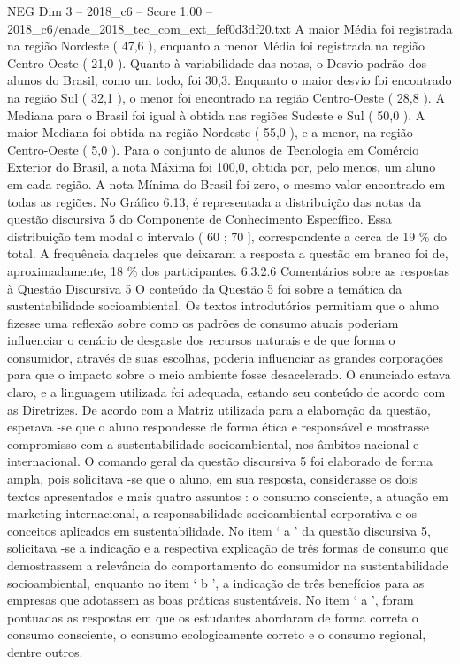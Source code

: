 \begin{textsample}{NEG Dim 3 – 2018\_c6 – Score 1.00 – 2018\_c6/enade\_2018\_tec\_com\_ext\_fef0d3df20.txt}
A maior Média foi registrada na região Nordeste ( 47,6 ), enquanto a menor Média foi registrada na região Centro-Oeste ( 21,0 ).
Quanto à variabilidade das notas, o Desvio padrão dos alunos do Brasil, como um todo, foi 30,3.
Enquanto o maior desvio foi encontrado na região Sul ( 32,1 ), o menor foi encontrado na região Centro-Oeste ( 28,8 ).
A Mediana para o Brasil foi igual à obtida nas regiões Sudeste e Sul ( 50,0 ).
A maior Mediana foi obtida na região Nordeste ( 55,0 ), e a menor, na região Centro-Oeste ( 5,0 ).
Para o conjunto de alunos de Tecnologia em Comércio Exterior do Brasil, a nota Máxima foi 100,0, obtida por, pelo menos, um aluno em cada região.
A nota Mínima do Brasil foi zero, o mesmo valor encontrado em todas as regiões.
No Gráfico 6.13, é representada a distribuição das notas da questão discursiva 5 do Componente de Conhecimento Específico.
Essa distribuição tem modal o intervalo ( 60 ; 70 ], correspondente a cerca de 19 \% do total.
A frequência daqueles que deixaram a resposta a questão em branco foi de, aproximadamente, 18 \% dos participantes. 6.3.2.6 Comentários sobre as respostas à Questão Discursiva 5 O conteúdo da Questão 5 foi sobre a temática da sustentabilidade socioambiental.
Os textos introdutórios permitiam que o aluno fizesse uma reflexão sobre como os padrões de consumo atuais poderiam influenciar o cenário de desgaste dos recursos naturais e de que forma o consumidor, através de suas escolhas, poderia influenciar as grandes corporações para que o impacto sobre o meio ambiente fosse desacelerado.
O enunciado estava claro, e a linguagem utilizada foi adequada, estando seu conteúdo de acordo com as Diretrizes.
De acordo com a Matriz utilizada para a elaboração da questão, esperava -se que o aluno respondesse de forma ética e responsável e mostrasse compromisso com a sustentabilidade socioambiental, nos âmbitos nacional e internacional.
O comando geral da questão discursiva 5 foi elaborado de forma ampla, pois solicitava -se que o aluno, em sua resposta, considerasse os dois textos apresentados e mais quatro assuntos : o consumo consciente, a atuação em marketing internacional, a responsabilidade socioambiental corporativa e os conceitos aplicados em sustentabilidade.
No item ‘ a ’ da questão discursiva 5, solicitava -se a indicação e a respectiva explicação de três formas de consumo que demostrassem a relevância do comportamento do consumidor na sustentabilidade socioambiental, enquanto no item ‘ b ’, a indicação de três benefícios para as empresas que adotassem as boas práticas sustentáveis.
No item ‘ a ’, foram pontuadas as respostas em que os estudantes abordaram de forma correta o consumo consciente, o consumo ecologicamente correto e o consumo regional, dentre outros.

\end{textsample}
